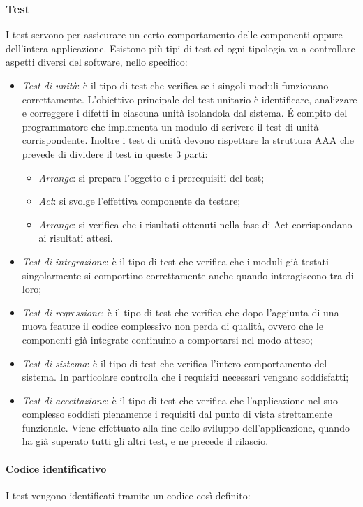 \subsubsection{Test}
I test servono per assicurare un certo comportamento delle componenti oppure dell'intera applicazione. Esistono più tipi di test ed ogni tipologia va a controllare aspetti diversi del software, nello specifico:
\begin{itemize}
    \item \textit{Test di unità}:  è il tipo di test che verifica se i singoli moduli funzionano correttamente. L'obiettivo principale del test unitario è identificare, analizzare e correggere i difetti in ciascuna unità isolandola dal sistema. É compito del programmatore che implementa un modulo di scrivere il test di unità corrispondente. Inoltre i test di unità devono rispettare la struttura AAA che prevede di dividere il test in queste 3 parti:
	\begin{itemize}
		\item \textit{Arrange}: si prepara l'oggetto e i prerequisiti del test;
		\item \textit{Act}: si svolge l'effettiva componente da testare;
		\item \textit{Arrange}: si verifica che i risultati ottenuti nella fase di Act corrispondano ai risultati attesi.
	\end{itemize}
    \item \textit{Test di integrazione}: è il tipo di test che verifica che i moduli già testati singolarmente si comportino correttamente anche quando interagiscono tra di loro;
    \item \textit{Test di regressione}: è il tipo di test che verifica che dopo l'aggiunta di una nuova feature il codice complessivo non perda di qualità, ovvero che le componenti già integrate continuino a comportarsi nel modo atteso;
    \item \textit{Test di sistema}:  è il tipo di test che verifica l'intero comportamento del sistema. In particolare controlla che i requisiti necessari vengano soddisfatti;
    \item \textit{Test di accettazione}:  è il tipo di test che verifica che l'applicazione nel suo complesso soddisfi pienamente i requisiti dal punto di vista strettamente funzionale. Viene effettuato alla fine dello sviluppo dell'applicazione, quando ha già superato tutti gli altri test, e ne precede il rilascio.
\end{itemize}

\paragraph{Codice identificativo}
I test vengono identificati tramite un codice così definito:

